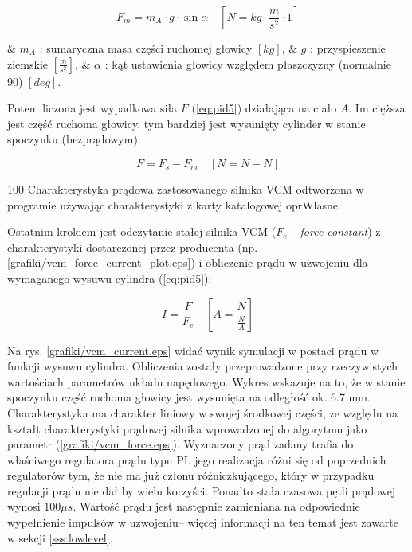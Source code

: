 \begin{equation} \label{eq:pid4}
	F_m = m_A \cdot g \cdot \sin \alpha \quad [ N = kg \cdot \frac{m}{s^2} \cdot 1 ]
\end{equation}

\begin{easylist}
	& $ m_A $ : sumaryczna masa części ruchomej głowicy $ [kg] $,
	& $ g $ : przyspieszenie ziemskie $ [\frac{m}{s^2}] $,
	& $ \alpha $ : kąt ustawienia głowicy względem płaszczyzny (normalnie 90\degree{}) $ [deg] $.
	\\
\end{easylist} 

Potem liczona jest wypadkowa siła $ F $ (\ref{eq:pid5}) działająca na ciało $ A $. Im cięższa jest część ruchoma głowicy, tym bardziej jest wysunięty cylinder w stanie spoczynku (bezprądowym). 

\begin{equation} \label{eq:pid5}
	F = F_s - F_m \quad [ N = N - N ]
\end{equation}

	{100}
	{Charakterystyka prądowa zastosowanego silnika VCM odtworzona w programie używając charakterystyki z karty katalogowej}
	{oprWlasne}

Ostatnim krokiem jest odczytanie stałej silnika VCM ($ F_c $ -- {\it force constant}) z charakterystyki dostarczonej przez producenta (np. \ref{grafiki/vcm_force_current_plot.eps}) i obliczenie prądu w uzwojeniu dla wymaganego wysuwu cylindra (\ref{eq:pid5}):

\begin{equation} \label{eq:pid6}
	I = \frac{F}{F_c} \quad [ A = \frac{N}{\frac{N}{A}} ]
\end{equation}
	
Na rys. \ref{grafiki/vcm_current.eps} widać wynik symulacji w postaci prądu w funkcji wysuwu cylindra. Obliczenia zostały przeprowadzone przy rzeczywistych wartościach parametrów układu napędowego. Wykres wskazuje na to, że w stanie spoczynku część ruchoma głowicy jest wysunięta na odległość ok. 6.7 mm. Charakterystyka ma charakter liniowy w swojej środkowej części, ze względu na kształt charakterystyki prądowej silnika wprowadzonej do algorytmu jako parametr (\ref{grafiki/vcm_force.eps}). 
Wyznaczony prąd zadany trafia do właściwego regulatora prądu typu PI. jego realizacja różni się od poprzednich regulatorów tym, że nie ma już członu różniczkującego, który w przypadku regulacji prądu nie dał by wielu korzyści. Ponadto stała czasowa pętli prądowej wynosi $ 100 \mu s $. Wartość prądu jest następnie zamieniana na odpowiednie wypełnienie impulsów w uzwojeniu-- więcej informacji na ten temat jest zawarte w sekcji \ref{sss:lowlevel}.

